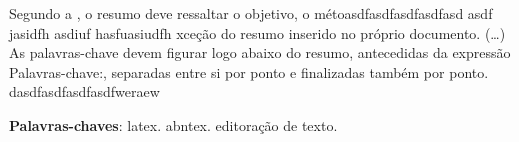  \setlength{\absparsep}{18pt} %
 \begin{resumo}
 Segundo a , o resumo deve ressaltar o
 objetivo, o m\'{e}toasdfasdfasdfasdfasd asdf jasidfh asdiuf hasfuasiudfh xce\c{c}\~{a}o do resumo inserido no
 pr\'{o}prio documento. (\ldots) As palavras-chave devem figurar logo abaixo do
 resumo, antecedidas da express\~{a}o Palavras-chave:, separadas entre si por
 ponto e finalizadas tamb\'{e}m por ponto. dasdfasdfasdfasdfweraew

 \noindent
 \textbf{Palavras-chaves}: latex. abntex. editora\c{c}\~{a}o de texto. 
 \end{resumo}